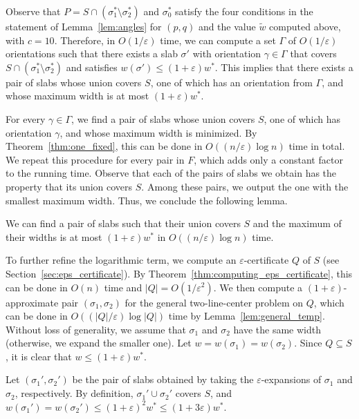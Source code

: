 \documentclass[english,a4paper, cleveref, autoref, thm-restate, nolineno]{socg-lipics-v2021}
\theoremstyle{star}
\theoremstyle{claimstar}
\newcommand{\eps}{\ensuremath{\varepsilon}}
\begin{document}
Observe that $P = S \cap (\sigma_1^* \setminus \sigma_2^*)$ and $\sigma_0^*$ satisfy the four conditions in the statement of Lemma~\ref{lem:angles} for $(p, q)$ and the value $\widetilde w$ computed above, with $c = 10$.  
Therefore, in $O(1/\eps)$ time, we can compute a set $\Gamma$ of $O(1/\eps)$ orientations such that there exists a slab $\sigma'$ with orientation $\gamma \in \Gamma$ that covers $S \cap (\sigma_1^* \setminus \sigma_2^*)$ and satisfies $w(\sigma') \le (1+\eps) w^*$.  
This implies that there exists a pair of slabs whose union covers $S$, one of which has an orientation from $\Gamma$, and whose maximum width is at most $(1+\eps) w^*$.

For every $\gamma \in \Gamma$, we find a pair of slabs whose union covers $S$, one of which has orientation $\gamma$, and whose maximum width is minimized. 
By Theorem~\ref{thm:one_fixed}, this can be done in $O((n/\eps) \log n)$ time in total.  
We repeat this procedure for every pair in $F$, which adds only a constant factor to the running time.
Observe that each of the pairs of slabs we obtain has the property that its union covers $S$.
Among these pairs, we output the one with the smallest maximum width.  
Thus, we conclude the following lemma.



\begin{lemma}  
    \label{lem:general_temp}
    We can find a pair of slabs such that their union covers $S$ and the maximum of their widths is at most $(1+\eps)w^*$ in $O((n/\eps) \log n)$ time. 
\end{lemma}



To further refine the logarithmic term, we compute an $\eps$-certificate $Q$ of $S$ (see Section~\ref{sec:eps_certificate}). 
By Theorem~\ref{thm:computing_eps_certificate}, this can be done in $O(n)$ time and $|Q| = O(1/\eps^2)$. 
We then compute a $(1+\eps)$-approximate pair $(\sigma_1, \sigma_2)$ for the general two-line-center problem on $Q$, which can be done in $O((|Q|/\eps)\log |Q|)$ time by Lemma~\ref{lem:general_temp}.
Without loss of generality, we assume that $\sigma_1$ and $\sigma_2$ have the same width (otherwise, we expand the smaller one).
Let $w = w(\sigma_1) =  w(\sigma_2)$. 
Since $Q \subseteq S$, it is clear that $w \le (1+\eps)w^*$.

Let $(\sigma_1', \sigma_2')$ be the pair of slabs obtained by taking the $\eps$-expansions of $\sigma_1$ and $\sigma_2$, respectively. 
By definition, $\sigma_1' \cup \sigma_2'$ covers $S$, and 
$w(\sigma_1')= w(\sigma_2') \le (1+\eps)^2 w^* \le (1 +3\eps) w^*$.
\end{document}
